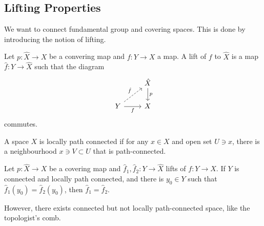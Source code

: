 \subsection{Lifting Properties}
We want to connect fundamental group and covering spaces.
This is done by introducing the notion of lifting.
\begin{definition}
    Let $p:\hat{X}\to X$ be a convering map and $f:Y\to X$ a map.
    A lift of $f$ to $\hat{X}$ is a map $\hat{f}:Y\to\hat{X}$ such that the diagram
    \[
        \begin{tikzcd}
            &\hat{X}\arrow{d}{p}\\
            Y\arrow[swap]{r}{f}\arrow[dashed]{ur}{\hat{f}}&X
        \end{tikzcd}
    \]
    commutes.
\end{definition}
\begin{definition}
    A space $X$ is locally path connected if for any $x\in X$ and open set $U\ni x$, there is a neighbourhood $x\ni V\subset U$ that is path-connected.
\end{definition}
\begin{lemma}\label{lift_unique}
    Let $p:\hat{X}\to X$ be a covering map and $\hat{f}_1,\hat{f}_2:Y\to\hat{X}$ lifts of $f:Y\to X$.
    If $Y$ is connected and locally path connected, and there is $y_0\in Y$ such that $\hat{f}_1(y_0)=\hat{f}_2(y_0)$, then $\hat{f}_1=\hat{f}_2$.
\end{lemma}
However, there exists connected but not locally path-connected space, like the topologist's comb.
